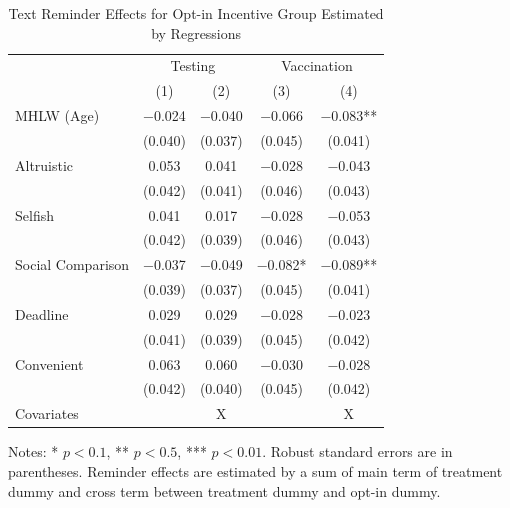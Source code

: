 \documentclass[
]{article}
\begin{document}
\begin{table}

\caption{\label{tab:lh-int}Text Reminder Effects for Opt-in Incentive Group Estimated by Regressions}
\centering
\fontsize{9}{11}\selectfont
\begin{threeparttable}
\begin{tabular}[t]{lcccc}
\toprule
\multicolumn{1}{c}{ } & \multicolumn{2}{c}{Testing} & \multicolumn{2}{c}{Vaccination} \\
\cmidrule(l{3pt}r{3pt}){2-3} \cmidrule(l{3pt}r{3pt}){4-5}
  & (1) & (2) & (3) & (4)\\
\midrule
MHLW (Age) & \num{-0.024} & \num{-0.040} & \num{-0.066} & \num{-0.083}**\\
 & (\num{0.040}) & (\num{0.037}) & (\num{0.045}) & (\num{0.041})\\
Altruistic & \num{0.053} & \num{0.041} & \num{-0.028} & \num{-0.043}\\
 & (\num{0.042}) & (\num{0.041}) & (\num{0.046}) & (\num{0.043})\\
Selfish & \num{0.041} & \num{0.017} & \num{-0.028} & \num{-0.053}\\
 & (\num{0.042}) & (\num{0.039}) & (\num{0.046}) & (\num{0.043})\\
Social Comparison & \num{-0.037} & \num{-0.049} & \num{-0.082}* & \num{-0.089}**\\
 & (\num{0.039}) & (\num{0.037}) & (\num{0.045}) & (\num{0.041})\\
Deadline & \num{0.029} & \num{0.029} & \num{-0.028} & \num{-0.023}\\
 & (\num{0.041}) & (\num{0.039}) & (\num{0.045}) & (\num{0.042})\\
Convenient & \num{0.063} & \num{0.060} & \num{-0.030} & \num{-0.028}\\
 & (\num{0.042}) & (\num{0.040}) & (\num{0.045}) & (\num{0.042})\\
Covariates &  & X &  & X\\
\bottomrule
\end{tabular}
\begin{tablenotes}
\item Notes: * $p < 0.1$, ** $p < 0.5$, *** $p < 0.01$. Robust standard errors are in parentheses. Reminder effects are estimated by a sum of main term of treatment dummy and cross term between treatment dummy and opt-in dummy.
\end{tablenotes}
\end{threeparttable}
\end{table}
\end{document}
